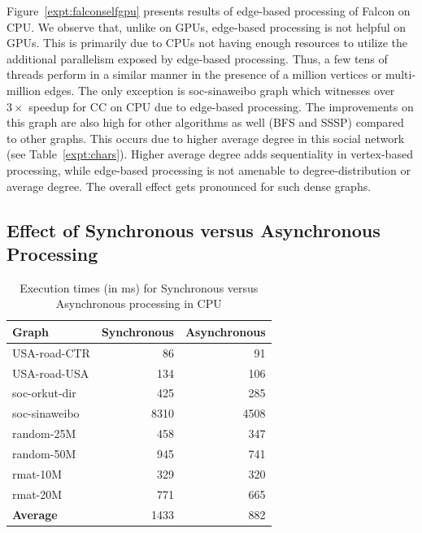 Figure~\ref{expt:falconselfgpu} presents results of edge-based processing of Falcon on CPU.
We observe that, unlike on GPUs, edge-based processing is not helpful on GPUs. %
This is primarily due to CPUs not having enough resources to utilize the additional parallelism exposed by edge-based processing.
Thus, a few tens of threads perform in a similar manner in the presence of a million vertices or multi-million edges.
The only exception is soc-sinaweibo graph which witnesses over $3\times$ speedup for CC on CPU due to edge-based processing.
The improvements on this graph are also high for other algorithms as well (BFS and SSSP) compared to other graphs.
This occurs due to higher average degree in this social network (see Table~\ref{expt:chars}).%
Higher average degree adds sequentiality in vertex-based processing, while edge-based processing is not amenable to degree-distribution or average degree.
The overall effect gets pronounced for such dense graphs.

\subsection{Effect of Synchronous versus Asynchronous Processing}\label{expt:syncasync}
\begin{table}
\centering
\footnotesize
\begin{tabular}{|l|r|r|}
\hline
\textbf{Graph} & \textbf{Synchronous}  & \textbf{Asynchronous}\\
\hline
USA-road-CTR &	  86	& 91 	\\
USA-road-USA &	  134	& 106   \\
soc-orkut-dir &   425	& 285   \\
soc-sinaweibo &   8310	& 4508  \\
random-25M &   	  458	& 347   \\
random-50M &   	  945	& 741   \\
rmat-10M &   	  329	& 320   \\
rmat-20M &   	  771	& 665   \\
\hline
\textbf{Average}	&	1433	& 882	\\
\hline
\end{tabular}
\caption{Execution times (in ms) for Synchronous versus Asynchronous processing in CPU}
\label{tab:async-cpu}
\end{table}

